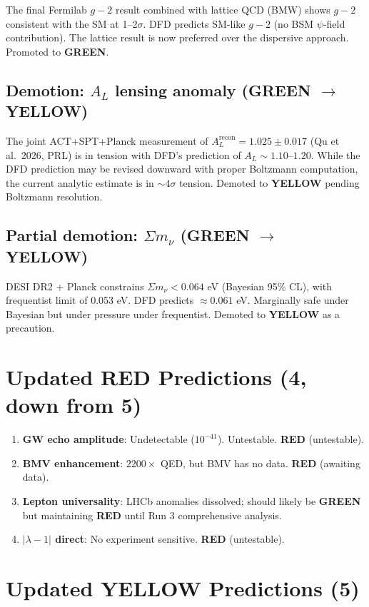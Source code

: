 \documentclass[11pt,a4paper]{article}
\newcommand{\GREEN}{\textcolor{dfdgreen}{\textbf{GREEN}}}
\newcommand{\YELLOW}{\textcolor{dfdyellow}{\textbf{YELLOW}}}
\newcommand{\RED}{\textcolor{dfdred}{\textbf{RED}}}
\begin{document}
The final Fermilab $g-2$ result combined with lattice QCD (BMW) shows $g-2$ consistent with the SM at 1--2$\sigma$. DFD predicts SM-like $g-2$ (no BSM $\psi$-field contribution). The lattice result is now preferred over the dispersive approach. Promoted to \GREEN{}.

\subsection{Demotion: $A_L$ lensing anomaly (\GREEN{} $\to$ \YELLOW)}

The joint ACT+SPT+Planck measurement of $A_L^{\text{recon}} = 1.025 \pm 0.017$ (Qu et al.\ 2026, PRL) is in tension with DFD's prediction of $A_L \sim 1.10$--$1.20$. While the DFD prediction may be revised downward with proper Boltzmann computation, the current analytic estimate is in $\sim 4\sigma$ tension. Demoted to \YELLOW{} pending Boltzmann resolution.

\subsection{Partial demotion: $\Sigma m_\nu$ (\GREEN{} $\to$ \YELLOW)}

DESI DR2 + Planck constrains $\Sigma m_\nu < 0.064$ eV (Bayesian 95\% CL), with frequentist limit of 0.053 eV. DFD predicts $\approx 0.061$ eV. Marginally safe under Bayesian but under pressure under frequentist. Demoted to \YELLOW{} as a precaution.

\section{Updated RED Predictions (4, down from 5)}

\begin{enumerate}
\item \textbf{GW echo amplitude}: Undetectable ($10^{-41}$). Untestable. \RED{} (untestable).
\item \textbf{BMV enhancement}: $2200\times$ QED, but BMV has no data. \RED{} (awaiting data).
\item \textbf{Lepton universality}: LHCb anomalies dissolved; should likely be \GREEN{} but maintaining \RED{} until Run 3 comprehensive analysis.
\item \textbf{$|\lambda-1|$ direct}: No experiment sensitive. \RED{} (untestable).
\end{enumerate}

\section{Updated YELLOW Predictions (5)}
\end{document}
